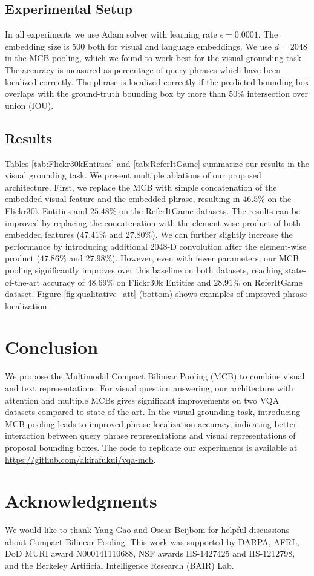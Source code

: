 \documentclass[11pt,letterpaper]{article}
\begin{document}
\subsection{Experimental Setup}
In all experiments we use Adam solver \cite{kingma2014adam} with learning rate $\epsilon = 0.0001$. The embedding size is $500$ both for visual and language embeddings. We use $d=2048$ in the MCB pooling, which we found to work best for the visual grounding task. The accuracy is measured as percentage of query phrases which have been localized correctly. The phrase is localized correctly if the predicted bounding box overlaps with the ground-truth bounding box by more than $50\%$ intersection over union (IOU).


\subsection{Results}
Tables \ref{tab:Flickr30kEntities} and \ref{tab:ReferItGame} summarize our results in the visual grounding task. We present multiple ablations of our proposed architecture. First, we replace the MCB with simple concatenation of the embedded visual feature and the embedded phrase, resulting in $46.5\%$ on the Flickr30k Entities and $25.48\%$ on the ReferItGame datasets. The results can be improved by replacing the concatenation with the element-wise product of both embedded features ($47.41\%$ and $27.80\%$). We can further slightly increase the performance by introducing additional 2048-D convolution after the element-wise product ($47.86\%$ and $27.98\%$). However, even with fewer parameters, our MCB pooling significantly improves over this baseline on both datasets, reaching state-of-the-art accuracy of $48.69\%$ on Flickr30k Entities and $28.91\%$ on ReferItGame dataset. Figure \ref{fig:qualitative_att} (bottom) shows examples of improved phrase localization.


\section{Conclusion}
We propose the Multimodal Compact Bilinear Pooling (MCB) to combine visual and text representations. For visual question answering, our architecture with attention and multiple MCBs gives significant improvements on two VQA datasets compared to state-of-the-art. In the visual grounding task, introducing MCB pooling leads to improved phrase localization accuracy, indicating better interaction between query phrase representations and visual representations of proposal bounding boxes. The code to replicate our experiments is available at \url{https://github.com/akirafukui/vqa-mcb}.

\section*{Acknowledgments}
We would like to thank Yang Gao and Oscar Beijbom for helpful discussions about Compact Bilinear Pooling.
This work was supported by DARPA, AFRL, DoD MURI award N000141110688, NSF awards IIS-1427425 and IIS-1212798, and the Berkeley Artificial Intelligence Research (BAIR) Lab.



\end{document}
